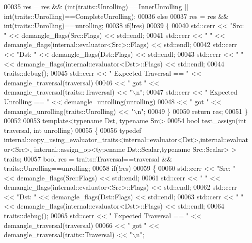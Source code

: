 \begin{DoxyCode}
00035     res = res && (int(traits::Unrolling)==InnerUnrolling || int(traits::Unrolling)==CompleteUnrolling);
00036   \textcolor{keywordflow}{else}
00037     res = res && int(traits::Unrolling)==unrolling;
00038   \textcolor{keywordflow}{if}(!res)
00039   \{
00040     std::cerr << \textcolor{stringliteral}{"Src: "} << demangle\_flags(Src::Flags) << std::endl;
00041     std::cerr << \textcolor{stringliteral}{"     "} << demangle\_flags(internal::evaluator<Src>::Flags) << std::endl;
00042     std::cerr << \textcolor{stringliteral}{"Dst: "} << demangle\_flags(Dst::Flags) << std::endl;
00043     std::cerr << \textcolor{stringliteral}{"     "} << demangle\_flags(internal::evaluator<Dst>::Flags) << std::endl;
00044     traits::debug();
00045     std::cerr << \textcolor{stringliteral}{" Expected Traversal == "} << demangle\_traversal(traversal)
00046               << \textcolor{stringliteral}{" got "} << demangle\_traversal(traits::Traversal) << \textcolor{stringliteral}{"\(\backslash\)n"};
00047     std::cerr << \textcolor{stringliteral}{" Expected Unrolling == "} << demangle\_unrolling(unrolling)
00048               << \textcolor{stringliteral}{" got "} << demangle\_unrolling(traits::Unrolling) << \textcolor{stringliteral}{"\(\backslash\)n"};
00049   \}
00050   \textcolor{keywordflow}{return} res;
00051 \}
00052 
00053 \textcolor{keyword}{template}<\textcolor{keyword}{typename} Dst, \textcolor{keyword}{typename} Src>
00054 \textcolor{keywordtype}{bool} test\_assign(\textcolor{keywordtype}{int} traversal, \textcolor{keywordtype}{int} unrolling)
00055 \{
00056   \textcolor{keyword}{typedef} internal::copy\_using\_evaluator\_traits<internal::evaluator<Dst>,internal::evaluator<Src>, 
      internal::assign\_op<typename Dst::Scalar,typename Src::Scalar> > traits;
00057   \textcolor{keywordtype}{bool} res = traits::Traversal==traversal && traits::Unrolling==unrolling;
00058   \textcolor{keywordflow}{if}(!res)
00059   \{
00060     std::cerr << \textcolor{stringliteral}{"Src: "} << demangle\_flags(Src::Flags) << std::endl;
00061     std::cerr << \textcolor{stringliteral}{"     "} << demangle\_flags(internal::evaluator<Src>::Flags) << std::endl;
00062     std::cerr << \textcolor{stringliteral}{"Dst: "} << demangle\_flags(Dst::Flags) << std::endl;
00063     std::cerr << \textcolor{stringliteral}{"     "} << demangle\_flags(internal::evaluator<Dst>::Flags) << std::endl;
00064     traits::debug();
00065     std::cerr << \textcolor{stringliteral}{" Expected Traversal == "} << demangle\_traversal(traversal)
00066               << \textcolor{stringliteral}{" got "} << demangle\_traversal(traits::Traversal) << \textcolor{stringliteral}{"\(\backslash\)n"};

\end{DoxyCode}
